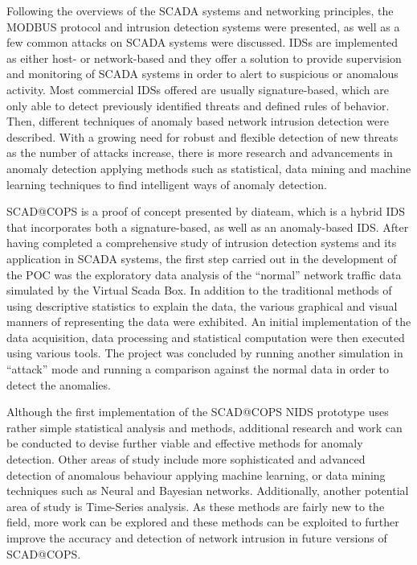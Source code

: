 \documentclass[11pt,a4paper]{article}
\begin{document}
Following the overviews of the SCADA systems and networking principles,
the MODBUS protocol and intrusion detection systems were presented, as
well as a few common attacks on SCADA systems were discussed. IDSs are
implemented as either host- or network-based and they offer a solution
to provide supervision and monitoring of SCADA systems in order to alert
to suspicious or anomalous activity. Most commercial IDSs offered are
usually signature-based, which are only able to detect previously
identified threats and defined rules of behavior. Then, different
techniques of anomaly based network intrusion detection were described.
With a growing need for robust and flexible detection of new threats as
the number of attacks increase, there is more research and advancements
in anomaly detection applying methods such as statistical, data mining
and machine learning techniques to find intelligent ways of anomaly
detection.

SCAD@COPS is a proof of concept presented by diateam, which is a hybrid
IDS that incorporates both a signature-based, as well as an
anomaly-based IDS. After having completed a comprehensive study of
intrusion detection systems and its application in SCADA systems, the
first step carried out in the development of the POC was the exploratory
data analysis of the ``normal'' network traffic data simulated by the
Virtual Scada Box. In addition to the traditional methods of using
descriptive statistics to explain the data, the various graphical and
visual manners of representing the data were exhibited. An initial
implementation of the data acquisition, data processing and statistical
computation were then executed using various tools. The project was
concluded by running another simulation in ``attack'' mode and running a
comparison against the normal data in order to detect the anomalies.

Although the first implementation of the SCAD@COPS NIDS prototype uses
rather simple statistical analysis and methods, additional research and
work can be conducted to devise further viable and effective methods for
anomaly detection. Other areas of study include more sophisticated and
advanced detection of anomalous behaviour applying machine learning, or
data mining techniques such as Neural and Bayesian networks.
Additionally, another potential area of study is Time-Series analysis.
As these methods are fairly new to the field, more work can be explored
and these methods can be exploited to further improve the accuracy and
detection of network intrusion in future versions of SCAD@COPS.
\end{document}
